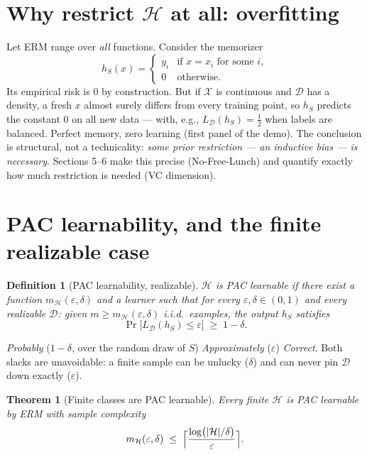 \documentclass[11pt]{article}
\newtheorem{theorem}{Theorem}
\newtheorem{definition}{Definition}
\newcommand{\X}{\mathcal{X}}
\newcommand{\D}{\mathcal{D}}
\newcommand{\Hyp}{\mathcal{H}}
\newcommand{\err}{L_{\D}}
\begin{document}
\section{Why restrict $\Hyp$ at all: overfitting}

Let ERM range over \emph{all} functions. Consider the memorizer
\begin{equation*}
  h_S(x) =
  \begin{cases}
    y_i & \text{if } x = x_i \text{ for some } i,\\
    0 & \text{otherwise.}
  \end{cases}
\end{equation*}
Its empirical risk is $0$ by construction. But if $\X$ is continuous and
$\D$ has a density, a fresh $x$ almost surely differs from every training
point, so $h_S$ predicts the constant $0$ on all new data --- with, e.g.,
$\err(h_S) = \tfrac12$ when labels are balanced. Perfect memory, zero
learning (first panel of the demo). The conclusion is structural, not a
technicality: \emph{some prior restriction --- an inductive bias --- is
necessary}. Sections 5--6 make this precise (No-Free-Lunch) and quantify
exactly how much restriction is needed (VC dimension).

\section{PAC learnability, and the finite realizable case}

\begin{definition}[PAC learnability, realizable]
$\Hyp$ is \emph{PAC learnable} if there exist a function
$m_{\Hyp}(\varepsilon,\delta)$ and a learner such that for every
$\varepsilon,\delta\in(0,1)$ and every realizable $\D$: given
$m \ge m_{\Hyp}(\varepsilon,\delta)$ i.i.d.\ examples, the output $h_S$
satisfies
\begin{equation}
  \Pr\bigl[\err(h_S) \le \varepsilon\bigr] \;\ge\; 1-\delta .
  \label{eq:pac}
\end{equation}
\end{definition}
\emph{Probably} ($1-\delta$, over the random draw of $S$)
\emph{Approximately} ($\varepsilon$) \emph{Correct}. Both slacks are
unavoidable: a finite sample can be unlucky ($\delta$) and can never pin
$\D$ down exactly ($\varepsilon$).

\begin{theorem}[Finite classes are PAC learnable]
\label{thm:finite}
Every finite $\Hyp$ is PAC learnable by ERM with sample complexity
\begin{equation}
  m_{\Hyp}(\varepsilon,\delta)
  \;\le\;
  \Bigl\lceil \frac{\log\bigl(|\Hyp|/\delta\bigr)}{\varepsilon}
  \Bigr\rceil .
  \label{eq:finitesample}
\end{equation}
\end{theorem}
\end{document}
